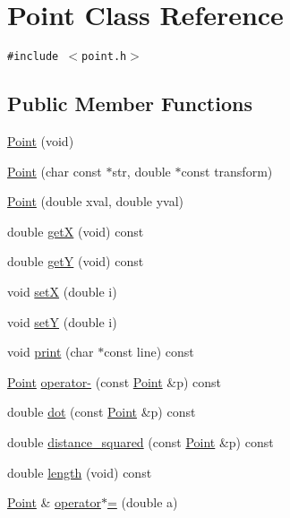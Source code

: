 \hypertarget{classPoint}{
\section{Point Class Reference}
\label{classPoint}
}
{\tt \#include $<$point.h$>$}

\subsection*{Public Member Functions}
\begin{CompactItemize}
\item 
\hyperlink{classPoint_94dc19d9beda0018169bd5ef8cd730c3}{Point} (void)
\item 
\hyperlink{classPoint_2a6d8ce5866c8d0e4e5c9d659ce6bfc2}{Point} (char const $\ast$str, double $\ast$const transform)
\item 
\hyperlink{classPoint_25ceb467297fed76765cde5c9ff20fa4}{Point} (double xval, double yval)
\item 
double \hyperlink{classPoint_b73ba91268c3d3b783fd2a0983066b38}{getX} (void) const 
\item 
double \hyperlink{classPoint_1b00b67b5e96ce7e02011c170f07bf11}{getY} (void) const 
\item 
void \hyperlink{classPoint_9290a4098a3331e34f158eeca694a26c}{setX} (double i)
\item 
void \hyperlink{classPoint_387c7e206f5ba0ea575020e53a66fb55}{setY} (double i)
\item 
void \hyperlink{classPoint_67517850a2ef6cfe8d6beb161be65e5c}{print} (char $\ast$const line) const 
\item 
\hyperlink{classPoint}{Point} \hyperlink{classPoint_6a869eababaaf863740e3196b9ca6780}{operator-} (const \hyperlink{classPoint}{Point} \&p) const 
\item 
double \hyperlink{classPoint_a51050f8b9868c12b1a9d063e8555d05}{dot} (const \hyperlink{classPoint}{Point} \&p) const 
\item 
double \hyperlink{classPoint_99717644bf38e3868c9ff7f32f4a9226}{distance\_\-squared} (const \hyperlink{classPoint}{Point} \&p) const 
\item 
double \hyperlink{classPoint_41052067de2f7e0be2bf0b60c1e7f60d}{length} (void) const 
\item 
\hyperlink{classPoint}{Point} \& \hyperlink{classPoint_aed1420449367308540f3459049ac2bd}{operator$\ast$=} (double a)
\end{CompactItemize}


